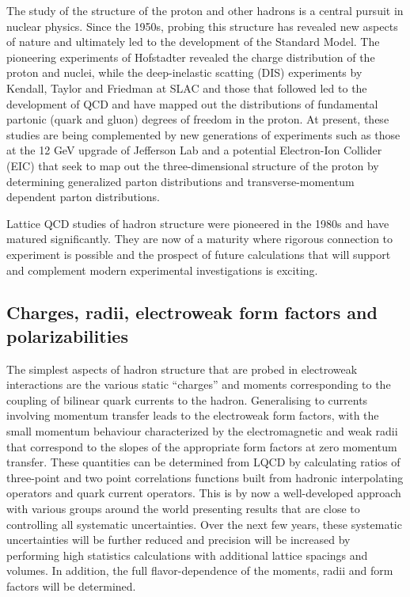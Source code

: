 
The study of the structure of the proton and other hadrons is a central pursuit in nuclear physics. Since the 1950s, probing this structure has revealed new aspects of nature and ultimately led to the development of the Standard Model. The pioneering experiments of Hofstadter revealed the charge distribution of the proton and nuclei, while the deep-inelastic scatting (DIS) experiments by Kendall, Taylor and Friedman at SLAC and those that followed led to the development of QCD and have mapped out  the distributions of fundamental partonic (quark and gluon) degrees of freedom in the proton. At present, these studies are being complemented by new generations of experiments such as those at the 12 GeV upgrade of Jefferson Lab and a potential Electron-Ion Collider (EIC) that seek to map out the three-dimensional structure of the proton by determining generalized parton distributions and transverse-momentum dependent parton distributions. 

Lattice QCD studies of hadron structure were pioneered in the 1980s and have matured significantly. They are now of a maturity where  rigorous connection to experiment is possible and the prospect of future calculations that will support and complement modern experimental investigations is exciting.


\subsection{Charges, radii,  electroweak form factors and polarizabilities}

The simplest aspects of hadron structure that are probed in electroweak interactions are the various static ``charges'' and moments corresponding to the coupling of bilinear quark currents to the hadron. Generalising to currents involving momentum transfer leads to the  electroweak form factors, with the small momentum behaviour characterized by the electromagnetic and weak radii that correspond to the slopes of the appropriate form factors at zero momentum transfer. These quantities can be determined from LQCD by calculating ratios of three-point and two point correlations functions built from hadronic interpolating operators and quark current operators. This is by now a well-developed approach with various groups around the world presenting results that are close to controlling all systematic uncertainties. Over the next few years, these systematic uncertainties will be further reduced  and  precision will be increased by performing high statistics calculations with additional lattice spacings and volumes. In addition, the full flavor-dependence of the moments, radii and form factors will be determined. 

